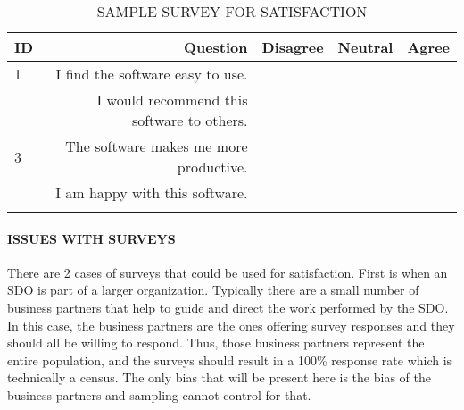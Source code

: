 \documentclass[SDSUThesis.tex]{subfiles}
\begin{document}
            
            \begin{longtable}{@{}l rr rr}
                \toprule%
                 \centering%
                 {\bfseries ID}
                 & {\bfseries Question}
                 & {\bfseries Disagree}
                 & {\bfseries Neutral}
                 & {\bfseries Agree}  \\
                
                \cmidrule[0.4pt](r{0.125em}){1-1}%
                \cmidrule[0.4pt](lr{0.125em}){2-2}%
                \cmidrule[0.4pt](l{0.125em}){3-3}%
                \cmidrule[0.4pt](l{0.125em}){4-4}%
                \cmidrule[0.4pt](l{0.125em}){5-5}%
                \endhead
                
                1 & I find the software easy to use.  & & & \\
                \myrowcolour%
                2 & I would recommend this software to others. & & & \\
                3 & The software makes me more productive. & & & \\
                \myrowcolour%
                4 & I am happy with this software. & & & \\
                
                \bottomrule
                
                \caption{SAMPLE SURVEY FOR SATISFACTION}
                \label{tab:samplesurvey}
            \end{longtable}
            
            
            
            \paragraph{ISSUES WITH SURVEYS}
                
                There are 2 cases of surveys that could be used for satisfaction.  First is when an SDO is part of a larger organization.  Typically there are a small number of business partners that help to guide and direct the work performed by the SDO.  In this case, the business partners are the ones offering survey responses and they should all be willing to respond.  Thus, those business partners represent the entire population, and the surveys should result in a 100\% response rate which is technically a census.  
         The only bias that will be present here is the bias of the business partners and sampling cannot control for that.
       
\end{document}
